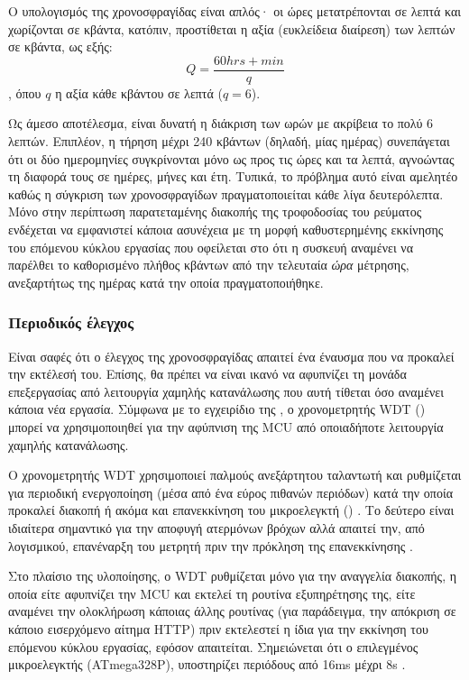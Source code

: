 Ο υπολογισμός της χρονοσφραγίδας είναι απλός· οι ώρες μετατρέπονται σε λεπτά και
χωρίζονται σε κβάντα, κατόπιν, προστίθεται η αξία (ευκλείδεια διαίρεση) των
λεπτών σε κβάντα, ως εξής:
\begin{equation}
Q = \frac{60 hrs + min}{q}
\end{equation}
, όπου $q$ η αξία κάθε κβάντου σε λεπτά ($q = 6$).

Ως άμεσο αποτέλεσμα, είναι δυνατή η διάκριση των ωρών με ακρίβεια το πολύ 6
λεπτών. Επιπλέον, η τήρηση μέχρι 240 κβάντων (δηλαδή, μίας ημέρας) συνεπάγεται
ότι οι δύο ημερομηνίες συγκρίνονται μόνο ως προς τις ώρες και τα λεπτά,
αγνοώντας τη διαφορά τους σε ημέρες, μήνες και έτη. Τυπικά, το πρόβλημα αυτό
είναι αμελητέο καθώς η σύγκριση των χρονοσφραγίδων πραγματοποιείται κάθε λίγα
δευτερόλεπτα. Μόνο στην περίπτωση παρατεταμένης διακοπής της τροφοδοσίας του
ρεύματος ενδέχεται να εμφανιστεί κάποια ασυνέχεια με τη μορφή καθυστερημένης
εκκίνησης του επόμενου κύκλου εργασίας που οφείλεται στο ότι η συσκευή αναμένει
να παρέλθει το καθορισμένο πλήθος κβάντων από την τελευταία \emph{ώρα} μέτρησης,
ανεξαρτήτως της ημέρας κατά την οποία πραγματοποιήθηκε.


\subsubsection{Περιοδικός έλεγχος}

Είναι σαφές ότι ο έλεγχος της χρονοσφραγίδας απαιτεί ένα έναυσμα που να προκαλεί
την εκτέλεσή του. Επίσης, θα πρέπει να είναι ικανό να αφυπνίζει τη μονάδα
επεξεργασίας από λειτουργία χαμηλής κατανάλωσης που αυτή τίθεται όσο αναμένει
κάποια νέα εργασία. Σύμφωνα με το εγχειρίδιο της \textcite[38]{atmel13}, ο
χρονομετρητής WDT () μπορεί να χρησιμοποιηθεί για την
αφύπνιση της MCU από οποιαδήποτε λειτουργία χαμηλής κατανάλωσης.

Ο χρονομετρητής WDT χρησιμοποιεί παλμούς ανεξάρτητου ταλαντωτή και ρυθμίζεται
για περιοδική ενεργοποίηση (μέσα από ένα εύρος πιθανών περιόδων) κατά την οποία
προκαλεί διακοπή ή ακόμα και επανεκκίνηση του μικροελεγκτή ()
\parencite[50]{atmel13}. Το δεύτερο είναι ιδιαίτερα σημαντικό για την αποφυγή
ατερμόνων βρόχων αλλά απαιτεί την, από λογισμικού, επανέναρξη του μετρητή πριν
την πρόκληση της επανεκκίνησης \parencite[50]{atmel13}.

Στο πλαίσιο της υλοποίησης, ο WDT ρυθμίζεται μόνο για την αναγγελία διακοπής, η
οποία είτε αφυπνίζει την MCU και εκτελεί τη ρουτίνα εξυπηρέτησης της, είτε
αναμένει την ολοκλήρωση κάποιας άλλης ρουτίνας (για παράδειγμα, την απόκριση σε
κάποιο εισερχόμενο αίτημα HTTP) πριν εκτελεστεί η ίδια για την εκκίνηση του
επόμενου κύκλου εργασίας, εφόσον απαιτείται. Σημειώνεται ότι ο επιλεγμένος
μικροελεγκτής (ATmega328P), υποστηρίζει περιόδους από 16ms μέχρι 8s
\parencite[55]{atmel13}.


